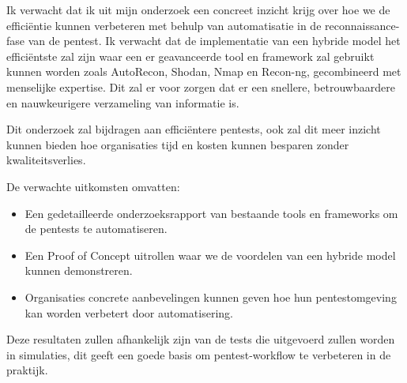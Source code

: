 

Ik verwacht dat ik uit mijn onderzoek een concreet inzicht krijg over hoe we de efficiëntie kunnen verbeteren met behulp van
automatisatie in de reconnaissance-fase van de pentest. Ik verwacht dat de implementatie van een hybride model het efficiëntste
zal zijn waar een er geavanceerde tool en framework zal gebruikt kunnen worden zoals AutoRecon, Shodan, Nmap en Recon-ng,
gecombineerd met menselijke expertise. Dit zal er voor zorgen dat er een snellere, betrouwbaardere en nauwkeurigere verzameling van informatie is.

Dit onderzoek zal bijdragen aan efficiëntere pentests, ook zal dit meer inzicht kunnen bieden hoe organisaties tijd en kosten
kunnen besparen zonder kwaliteitsverlies.

De verwachte uitkomsten omvatten:
\begin{itemize}
    \item Een gedetailleerde onderzoeksrapport van bestaande tools en frameworks om de pentests te automatiseren.
    \item Een Proof of Concept uitrollen waar we de voordelen van een hybride model kunnen demonstreren.
    \item Organisaties concrete aanbevelingen kunnen geven hoe hun pentestomgeving kan worden verbetert door automatisering.
\end{itemize}

Deze resultaten zullen afhankelijk zijn van de tests die uitgevoerd zullen worden in simulaties, dit geeft een goede basis om 
pentest-workflow te verbeteren in de praktijk.